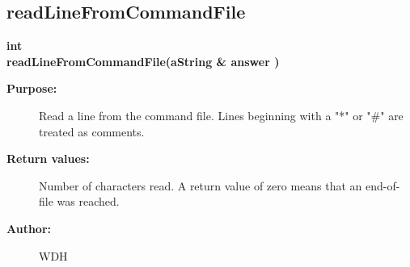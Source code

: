 \subsection{readLineFromCommandFile}
 
\begin{flushleft} \textbf{%
int   \\ 
\settowidth{\GenericGraphicsInterfaceIncludeArgIndent}{readLineFromCommandFile(}%
readLineFromCommandFile(aString \& answer )
}\end{flushleft}
\begin{description}
\item[{\bf Purpose:}]  Read a line from the command file. Lines beginning with a "*" or "\#" are
   treated as comments.
\item[{\bf Return values:}]  Number of characters read. A return value of zero means
   that an end-of-file was reached.
\item[{\bf Author:}]  WDH
\end{description}
